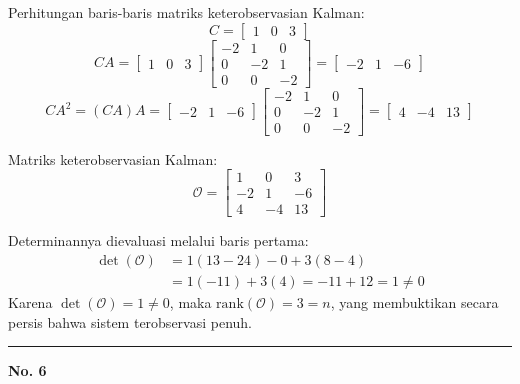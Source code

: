 \documentclass[11pt,a4paper]{article}
\begin{document}
Perhitungan baris-baris matriks keterobservasian Kalman:
$$C = \begin{bmatrix} 1 & 0 & 3 \end{bmatrix}$$
$$CA = \begin{bmatrix} 1 & 0 & 3 \end{bmatrix} \begin{bmatrix} -2 & 1 & 0 \\ 0 & -2 & 1 \\ 0 & 0 & -2 \end{bmatrix} = \begin{bmatrix} -2 & 1 & -6 \end{bmatrix}$$
$$CA^2 = (CA)A = \begin{bmatrix} -2 & 1 & -6 \end{bmatrix} \begin{bmatrix} -2 & 1 & 0 \\ 0 & -2 & 1 \\ 0 & 0 & -2 \end{bmatrix} = \begin{bmatrix} 4 & -4 & 13 \end{bmatrix}$$

Matriks keterobservasian Kalman:
$$\mathcal{O} = \begin{bmatrix} 1 & 0 & 3 \\ -2 & 1 & -6 \\ 4 & -4 & 13 \end{bmatrix}$$

Determinannya dievaluasi melalui baris pertama:
\begin{align*}
    \det(\mathcal{O}) &= 1(13 - 24) - 0 + 3(8 - 4) \\
    &= 1(-11) + 3(4) = -11 + 12 = 1 \ne 0
\end{align*}
Karena $\det(\mathcal{O}) = 1 \ne 0$, maka $\text{rank}(\mathcal{O}) = 3 = n$, yang membuktikan secara persis bahwa sistem terobservasi penuh.

\vspace{12pt}
\hrule
\vspace{10pt}

\textbf{\large No. 6}
\end{document}
